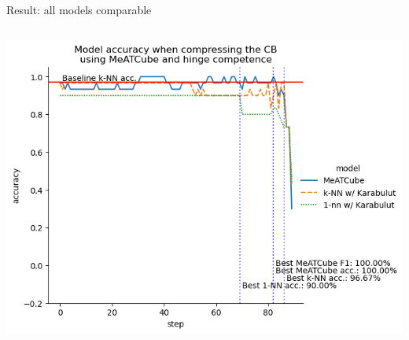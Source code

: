 \documentclass[]{beamer}
\begin{document}
\begin{frame}{Result: all models comparable}
\begin{columns}
\begin{column}{.65\textwidth}
            \includegraphics[width=.8\textwidth]{../results-weight-estim+/figs/iris.png}
        \end{column}
    \end{columns}
\end{frame}
\end{document}
